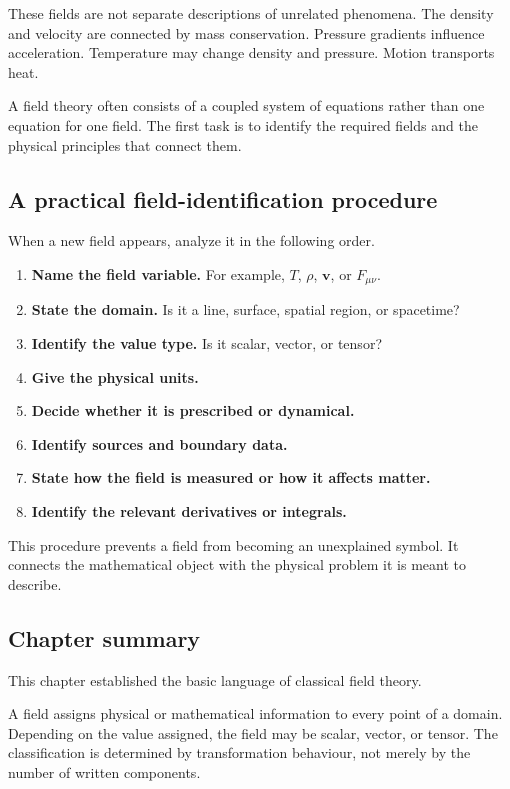 These fields are not separate descriptions of unrelated phenomena. The density and velocity are connected by mass conservation. Pressure gradients influence acceleration. Temperature may change density and pressure. Motion transports heat.

A field theory often consists of a coupled system of equations rather than one equation for one field. The first task is to identify the required fields and the physical principles that connect them.

\subsection{A practical field-identification procedure}

When a new field appears, analyze it in the following order.

\begin{enumerate}
    \item \textbf{Name the field variable.} For example, \(T\), \(\rho\), \(\mathbf{v}\), or \(F_{\mu\nu}\).
    \item \textbf{State the domain.} Is it a line, surface, spatial region, or spacetime?
    \item \textbf{Identify the value type.} Is it scalar, vector, or tensor?
    \item \textbf{Give the physical units.}
    \item \textbf{Decide whether it is prescribed or dynamical.}
    \item \textbf{Identify sources and boundary data.}
    \item \textbf{State how the field is measured or how it affects matter.}
    \item \textbf{Identify the relevant derivatives or integrals.}
\end{enumerate}

This procedure prevents a field from becoming an unexplained symbol. It connects the mathematical object with the physical problem it is meant to describe.

\subsection{Chapter summary}

This chapter established the basic language of classical field theory.

A field assigns physical or mathematical information to every point of a domain. Depending on the value assigned, the field may be scalar, vector, or tensor. The classification is determined by transformation behaviour, not merely by the number of written components.

